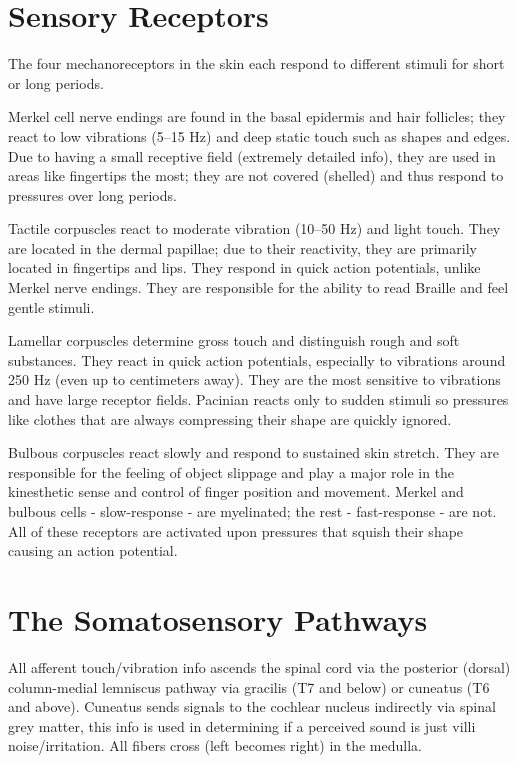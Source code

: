 \hypertarget{sensory-receptors}{%
\section{Sensory Receptors}\label{sensory-receptors}}

The four mechanoreceptors in the skin each respond to different stimuli for short or long periods.

Merkel cell nerve endings are found in the basal epidermis and hair follicles; they react to low vibrations (5--15 Hz) and deep static touch such as shapes and edges. Due to having a small receptive field (extremely detailed info), they are used in areas like fingertips the most; they are not covered (shelled) and thus respond to pressures over long periods.

Tactile corpuscles react to moderate vibration (10--50 Hz) and light touch. They are located in the dermal papillae; due to their reactivity, they are primarily located in fingertips and lips. They respond in quick action potentials, unlike Merkel nerve endings. They are responsible for the ability to read Braille and feel gentle stimuli.

Lamellar corpuscles determine gross touch and distinguish rough and soft substances. They react in quick action potentials, especially to vibrations around 250 Hz (even up to centimeters away). They are the most sensitive to vibrations and have large receptor fields. Pacinian reacts only to sudden stimuli so pressures like clothes that are always compressing their shape are quickly ignored.

Bulbous corpuscles react slowly and respond to sustained skin stretch. They are responsible for the feeling of object slippage and play a major role in the kinesthetic sense and control of finger position and movement. Merkel and bulbous cells - slow-response - are myelinated; the rest - fast-response - are not. All of these receptors are activated upon pressures that squish their shape causing an action potential.

\hypertarget{the-somatosensory-pathways}{%
\section{The Somatosensory Pathways}\label{the-somatosensory-pathways}}

All afferent touch/vibration info ascends the spinal cord via the posterior (dorsal) column-medial lemniscus pathway via gracilis (T7 and below) or cuneatus (T6 and above). Cuneatus sends signals to the cochlear nucleus indirectly via spinal grey matter, this info is used in determining if a perceived sound is just villi noise/irritation. All fibers cross (left becomes right) in the medulla.

